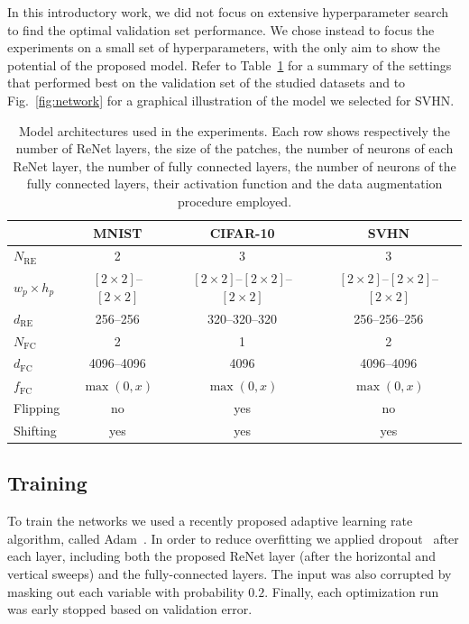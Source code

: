 In this introductory work, we did not focus on extensive hyperparameter
search to find the optimal validation set
performance. We chose instead to focus the experiments on a small set of
hyperparameters, with the only aim to show the potential of the proposed model.
Refer to Table~\ref{tbl:architectures} for a summary of the settings that performed
best on the validation set of the studied datasets and to Fig.~\ref{fig:network}
for a graphical illustration of the model we selected for SVHN.

\begin{table}[t]
    \centering
    \begin{tabular}{l || c | c | c }
        & MNIST & CIFAR-10 & SVHN \\
        \hline
        \hline
    $N_{\text{RE}}$ & 2 & 3 & 3 \\
        \hline
        $w_p \times h_p$ & $[2\times 2]$--$[2 \times 2]$ & $[2\times 2]$--$[2 \times 2]$--$[2
        \times 2]$ & $[2\times 2]$--$[2 \times 2]$--$[2 \times 2]$ \\
        \hline
    $d_{\text{RE}}$ & 256--256 & 320--320--320 & 256--256--256 \\
        \hline
    $N_{\text{FC}}$ & 2 & 1 & 2 \\
        \hline
    $d_{\text{FC}}$ & 4096--4096 & 4096 & 4096--4096 \\
        \hline
    $f_{\text{FC}}$ & $\max(0, x)$ & $\max(0,x)$ & $\max(0,x)$ \\
        \hline
    Flipping & no & yes & no \\
        \hline
    Shifting & yes & yes & yes \\
    \end{tabular}
    \caption{Model architectures used in the experiments. Each row shows
             respectively the number of ReNet layers, the size of the patches,
             the number of neurons of each ReNet layer, the number of fully
             connected layers, the number of neurons of the fully connected
             layers, their activation function and the data augmentation
             procedure employed.}
    \label{tbl:architectures}
\end{table}

\subsection{Training}

To train the networks we used a recently proposed adaptive learning rate
algorithm, called Adam~\citep{Kingma2014}. In order to reduce overfitting we
applied dropout~\citep{Srivastava14} after each layer, including both the
proposed ReNet layer (after the horizontal and vertical sweeps) and the
fully-connected layers. The input was also corrupted by masking out each variable
with probability $0.2$. Finally, each optimization run was early stopped based
on validation error.

